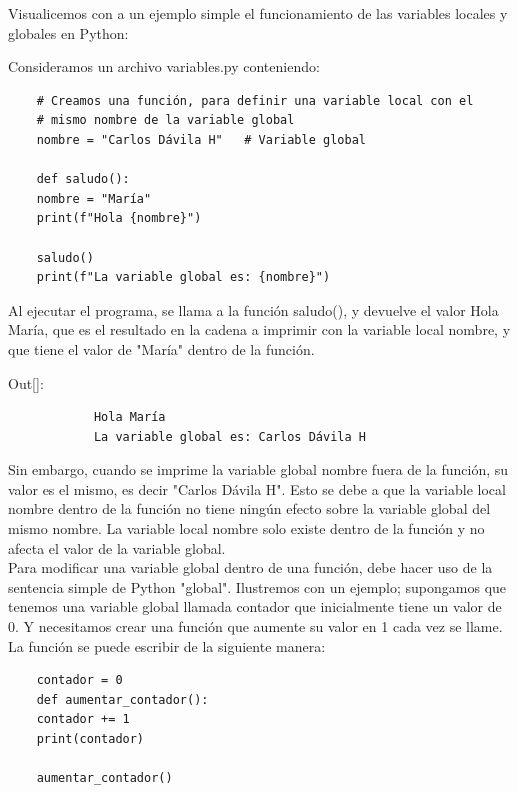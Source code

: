 Visualicemos  con  a un ejemplo simple el funcionamiento de las variables locales y globales en Python:

Consideramos un archivo {\ttfamily variables.py} conteniendo:

\hspace{-2.6cm}{\ttfamily \scriptsize variables.py}  \vspace{-0.5cm}
\begin{lstlisting}
	# Creamos una función, para definir una variable local con el 
	# mismo nombre de la variable global
	nombre = "Carlos Dávila H"   # Variable global
	
	def saludo():
	nombre = "María"
	print(f"Hola {nombre}")
	
	saludo()
	print(f"La variable global es: {nombre}")
\end{lstlisting}

Al ejecutar el programa, se llama a la función  {\ttfamily saludo()},  y devuelve el valor {\ttfamily  Hola  María}, que es el resultado en la cadena a imprimir con la variable local {\ttfamily nombre}, y que tiene el  valor de {\ttfamily {}"{}María{}"{}} dentro de la función.\vspace{0.08cm}

{\ttfamily\scriptsize\noindent Out[]: \vspace{-0.3cm}	
	{\color{blue} 
		\begin{verbatim}
			Hola María
			La variable global es: Carlos Dávila H		
		\end{verbatim}
}}

Sin embargo, cuando se imprime la variable global {\ttfamily nombre} fuera de la función, su valor es el mismo, es decir {\ttfamily {}"{}Carlos Dávila H{}"{}}. Esto se debe a que la variable local {\ttfamily nombre} dentro de la función no tiene ningún efecto sobre la variable global del mismo nombre. La variable local nombre solo existe dentro de la función y no afecta el valor de la variable global.\\

Para modificar una variable global dentro de una función, debe hacer uso de la sentencia simple de Python {\ttfamily {}"{}global{}"{}}. Ilustremos  con un ejemplo; supongamos que tenemos una variable global llamada {\ttfamily contador} que inicialmente tiene un valor de 0. Y necesitamos crear una función que aumente su valor en 1 cada vez se llame. La función  se puede escribir de la siguiente manera:

\hspace{-2.6cm}{\ttfamily \scriptsize contador.py}\vspace{-0.5cm}	
\begin{lstlisting}
	contador = 0
	def aumentar_contador():
	contador += 1
	print(contador)
	
	aumentar_contador()
\end{lstlisting}

